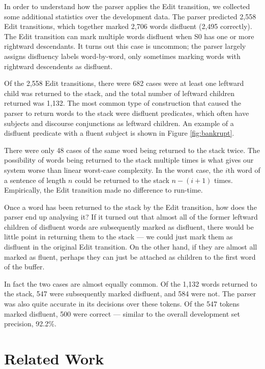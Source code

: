 \documentclass[11pt,letterpaper]{article}
\begin{document}
In order to understand how the parser applies the Edit transition, we
collected some additional statistics over the development data.
The parser predicted 2,558 Edit transitions,
which together marked 2,706
words disfluent (2,495 correctly).  The Edit transition can mark multiple words
disfluent when S0 has one or more rightward descendants. It turns out this case
is uncommon;
the parser largely assigns disfluency labels
word-by-word, only sometimes marking words with rightward descendents as disfluent.

Of the 2,558 Edit transitions, there were 682 cases were at least one leftward
child was returned to the stack, and the total number of leftward children returned
was 1,132. The most common type of construction that caused the parser to return
words to the stack
were disfluent predicates, which often have subjects and discourse conjunctions as leftward
children. An example of a disfluent predicate with a fluent subject is shown
in Figure \ref{fig:bankrupt}.

There were only 48 cases of the same word being returned to the stack twice. The
possibility of words being returned to the stack multiple times is what gives our
system worse than linear worst-case complexity. In the worst case, the $i$th word
of a sentence of length $n$ could be returned to the stack $n-(i+1)$ times.
Empirically, the Edit transition made no difference to run-time.

Once a word has been returned to the stack by the Edit transition, how does the
parser end up analysing it?  If it turned out that almost all of the former leftward
children of disfluent words are subsequently marked as disfluent, there would
be little point in returning them to the stack --- we could just mark them as
disfluent in the original Edit transition.  On the other hand, if they are
almost all marked as fluent, perhaps they can just be attached as children
to the first word of the buffer.

In fact the two cases are almost equally common.  Of the 1,132 words returned
to the stack, 547 were subsequently marked disfluent, and 584 were not.  The
parser was also quite accurate in its decisions over these tokens.  Of the 547
tokens marked disfluent, 500 were correct --- similar to the overall development set 
precision, 92.2\%.

\section{Related Work}
\end{document}
